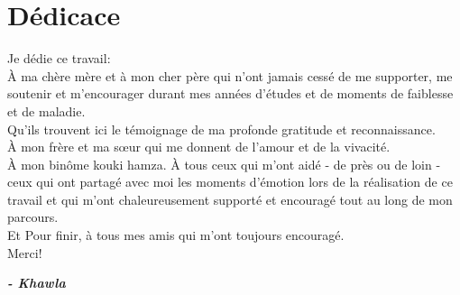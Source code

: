 \chapter*{Dédicace}

\begin{fquote}
\begin{center}
\large{
Je dédie ce travail:\\[12pt]
\uppercase{à} ma chère mère et à mon cher père qui n'ont jamais cessé de me supporter, me soutenir et m'encourager durant mes années d'études et de moments de faiblesse et de maladie.\\[12pt]
Qu'ils trouvent ici le témoignage de ma profonde gratitude et reconnaissance.
\\[12pt]
\uppercase{à} mon frère et ma sœur qui me donnent de l'amour et de la vivacité.
\\[12pt]
\uppercase{à} mon binôme kouki hamza.
\uppercase{à} tous ceux qui m'ont aidé - de près ou de loin - ceux qui ont partagé avec moi les moments d'émotion lors de la réalisation de ce travail et qui m'ont chaleureusement supporté et encouragé tout au long de mon parcours.\\[12pt]
\uppercase{E}t Pour finir, à tous mes amis qui m'ont toujours encouragé.\\[12pt]
Merci!
}
\end{center}
\bigskip
\medskip
\end{fquote}

\begin{adjustwidth}{2cm}{1cm}
\hspace*{\fill} \textbf{\textit{\large{- Khawla}}}
\end{adjustwidth}

\clearpage